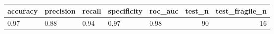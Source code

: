 \begin{tabular}{lllllrr}
\toprule
accuracy & precision & recall & specificity & roc\_auc & test\_n & test\_fragile\_n \\
\midrule
0.97 & 0.88 & 0.94 & 0.97 & 0.98 & 90 & 16 \\
\bottomrule
\end{tabular}
